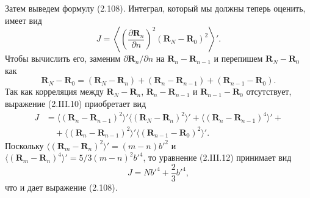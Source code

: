 \documentclass[12pt,a4paper]{article}
\begin{document}
Затем выведем формулу (2.108). Интеграл, который мы должны теперь оценить, имеет вид
\begin{equation}
J = \left\langle\left(\frac{\partial\boldsymbol{R}_n}{\partial n}\right)^2(\boldsymbol{R}_N - \boldsymbol{R}_0)^2\right\rangle'. \tag{2.III.10}
\end{equation}
Чтобы вычислить его, заменим $\partial\boldsymbol{R}_n/\partial n$ на $\boldsymbol{R}_n - \boldsymbol{R}_{n-1}$ и перепишем $\boldsymbol{R}_N - \boldsymbol{R}_0$ как
\begin{equation}
\boldsymbol{R}_N - \boldsymbol{R}_0 = (\boldsymbol{R}_N - \boldsymbol{R}_n) + (\boldsymbol{R}_n - \boldsymbol{R}_{n-1}) + (\boldsymbol{R}_{n-1} - \boldsymbol{R}_0). \tag{2.III.11}
\end{equation}
Так как корреляция между $\boldsymbol{R}_N - \boldsymbol{R}_n$, $\boldsymbol{R}_n - \boldsymbol{R}_{n-1}$ и $\boldsymbol{R}_{n-1} - \boldsymbol{R}_0$ отсутствует, выражение (2.III.10) приобретает вид
\begin{align}
J &= \langle(\boldsymbol{R}_n - \boldsymbol{R}_{n-1})^2\rangle'\langle(\boldsymbol{R}_N - \boldsymbol{R}_n)^2\rangle' + \langle(\boldsymbol{R}_n - \boldsymbol{R}_{n-1})^4\rangle' + \nonumber\\
&\quad + \langle(\boldsymbol{R}_n - \boldsymbol{R}_{n-1})^2\rangle'\langle(\boldsymbol{R}_{n-1} - \boldsymbol{R}_0)^2\rangle'. \tag{2.III.12}
\end{align}
Поскольку $\langle(\boldsymbol{R}_m - \boldsymbol{R}_n)^2\rangle' = (m - n)b'^2$ и $\langle(\boldsymbol{R}_m - \boldsymbol{R}_n)^4\rangle' = 5/3(m - n)^2 b'^4$, то уравнение (2.III.12) принимает вид
\begin{equation}
J = Nb'^4 + \frac{2}{3}b'^4, \tag{2.III.13}
\end{equation}
что и дает выражение (2.108).
\end{document}
